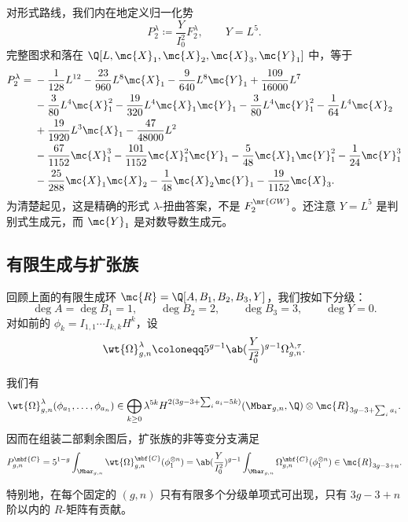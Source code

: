 对形式路线，我们内在地定义归一化势
\[ P_2^{\lambda} \coloneqq \frac{Y}{I_0^2}F_2^{\lambda}, \qquad Y = L^5. \]
完整图求和落在 \(\Q[L,\mc{X}_1,\mc{X}_2,\mc{X}_3,\mc{Y}_1]\) 中，等于
\begin{align*}
    P_2^{\lambda} ={}& -\frac{1}{128}L^{12} - \frac{23}{960}L^8\mc{X}_1 - \frac{9}{640}L^8\mc{Y}_1 + \frac{109}{16000}L^7 \\
    &- \frac{3}{80}L^4\mc{X}_1^2 - \frac{19}{320}L^4\mc{X}_1\mc{Y}_1 - \frac{3}{80}L^4\mc{Y}_1^2 - \frac{1}{64}L^4\mc{X}_2 \\
    &+ \frac{19}{1920}L^3\mc{X}_1 - \frac{47}{48000}L^2 \\
    &- \frac{67}{1152}\mc{X}_1^3 - \frac{101}{1152}\mc{X}_1^2\mc{Y}_1 - \frac{5}{48}\mc{X}_1\mc{Y}_1^2 - \frac{1}{24}\mc{Y}_1^3 \\
    &- \frac{25}{288}\mc{X}_1\mc{X}_2 - \frac{1}{48}\mc{X}_2\mc{Y}_1 - \frac{19}{1152}\mc{X}_3.
\end{align*}
为清楚起见，这是精确的形式 \(\lambda\)-扭曲答案，不是 \(F_2^{\mr{GW}}\)。还注意 \(Y = L^5\) 是判别式生成元，而 \(\mc{Y}_1\) 是对数导数生成元。

\subsection{有限生成与扩张族}%
\label{sub:Finite generation and the extended family}

回顾上面的有限生成环 \(\mc{R} = \Q[A,B_1,B_2,B_3,Y]\)，我们按如下分级：
\[ \deg A = \deg B_1 = 1, \qquad \deg B_2 = 2, \qquad \deg B_3 = 3, \qquad \deg Y = 0. \]
对如前的 \(\phi_k = I_{1,1}\cdots I_{k,k}H^k\)，设
\[ \wt{\Omega}^{\lambda}_{g,n} \coloneqq 5^{g-1}\ab(\frac{Y}{I_0^2})^{g-1}\Omega^{\lambda,\tau}_{g,n}. \]

\begin{thm}%
\label{thm:graded finite generation}
    我们有
    \[ \wt{\Omega}^{\lambda}_{g,n}(\phi_{a_1}, \ldots, \phi_{a_n}) \in \bigoplus_{k \geq 0}\lambda^{5k}H^{2(3g-3+\sum_i a_i - 5k)}(\Mbar_{g,n},\Q)\otimes \mc{R}_{3g-3+\sum_i a_i}. \]
    因而在组装二部剩余图后，扩张族的非等变分支满足
    \[ P^{\mbf{C}}_{g,n} = 5^{1-g}\int_{\Mbar_{g,n}}\wt{\Omega}^{\mbf{C}}_{g,n}(\phi_1^{\otimes n}) = \ab( \frac{Y}{I_0^2})^{g-1}\int_{\Mbar_{g,n}}\Omega^{\mbf{C}}_{g,n}(\phi_1^{\otimes n}) \in \mc{R}_{3g-3+n}. \]
\end{thm}

特别地，在每个固定的 \((g,n)\) 只有有限多个分级单项式可出现，只有 \(3g-3+n\) 阶以内的 \(R\)-矩阵有贡献。

